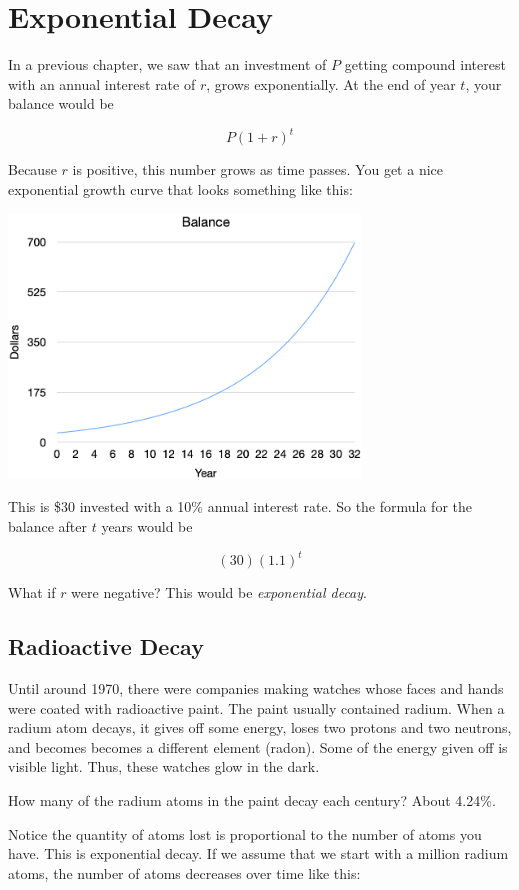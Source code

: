 \chapter{Exponential Decay}

In a previous chapter, we saw that an investment of $P$ getting
compound interest with an annual interest rate of $r$, grows
exponentially. At the end of year $t$, your balance would be

$$P\left(1 + r\right)^t$$

Because $r$ is positive, this number grows as time passes. You get a
nice exponential growth curve that looks something like this:

\includegraphics[width=0.7\textwidth]{exponential_growth.png}

This is \$30 invested with a 10\% annual interest rate. So the formula
for the balance after $t$ years would be

$$(30)(1.1)^t$$

What if $r$ were negative? This would be \textit{exponential decay}.

\section{Radioactive Decay}

Until around 1970, there were companies making watches whose faces and
hands were coated with radioactive paint. The paint usually contained
radium. When a radium atom decays, it gives off some energy, loses two
protons and two neutrons, and becomes becomes a different element
(radon). Some of the energy given off is visible light. Thus, these
watches glow in the dark.

How many of the radium atoms in the paint decay each century? About 4.24\%.

Notice the quantity of atoms lost is proportional to the number of
atoms you have. This is exponential decay. If we assume that we start
with a million radium atoms, the number of atoms decreases over time like this:

